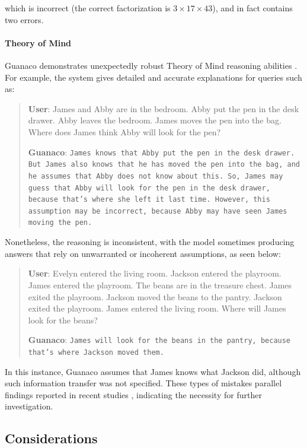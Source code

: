 which is incorrect (the correct factorization is $3 \times 17 \times 43$), and in fact contains two errors.

\paragraph{Theory of Mind} {Guanaco} demonstrates unexpectedly robust Theory of Mind reasoning abilities \cite{nematzadeh2018evaluating, sap2022neural}. For example, the system gives detailed and accurate explanations for queries such as:

\begin{quote}
    \textbf{User}: James and Abby are in the bedroom. Abby put the pen in the desk drawer. Abby leaves the bedroom. James moves the pen into the bag. Where does James think Abby will look for the pen?

    \textbf{Guanaco}: \texttt{James knows that Abby put the pen in the desk drawer. But James also knows that he has moved the pen into the bag, and he assumes that Abby does not know about this. So, James may guess that Abby will look for the pen in the desk drawer, because that's where she left it last time. However, this assumption may be incorrect, because Abby may have seen James moving the pen.}
\end{quote}

Nonetheless, the reasoning is inconsistent, with the model sometimes producing answers that rely on unwarranted or incoherent assumptions, as seen below:

\begin{quote}
    \textbf{User}: Evelyn entered the living room. Jackson entered the playroom. James entered the playroom. The beans are in the treasure chest. James exited the playroom. Jackson moved the beans to the pantry. Jackson exited the playroom. James entered the living room. Where will James look for the beans?

    \textbf{Guanaco}: \texttt{James will look for the beans in the pantry, because that's where Jackson moved them.}
\end{quote}

In this instance, {Guanaco} assumes that James knows what Jackson did, although such information transfer was not specified. These types of mistakes parallel findings reported in recent studies \cite{sap2022neural}, indicating the necessity for further investigation.

\subsection{Considerations}
\label{ssec:considerations}

